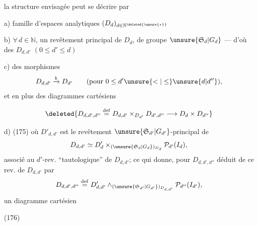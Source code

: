 la structure envisagée peut se décrire par

 a) famille d'espaces analytiques $(D_d)_{d\in\mathbb N^{\deleted{\unsure{*}}}}$

 b) $\forall\,d\in\mathbb N$, un revêtement principal  de $D_d$, de groupe $\unsure{\mathfrak S_d|G_d}$ --- d'où des $D_{d,d'}$ $(0\leq d'\leq d)$


 c) des morphismes
\[
D_{d,d'}\xrightarrow{b}D_{d'}\qquad(\text{pour }0\leq d'\unsure{<|\leq}\unsure{d|d''}),
\]
et en plus des diagrammes cartésiens

\[
\deleted{D_{d,d',d''}\overset{\mathrm{def}}{=}D_{d,d'}\mathbin\times_{D_{d'}}D_{d',d''}\longrightarrow D_d\mathbin\times D_{d''}}
\]

 d) \quad(175)
où $D'_{d,d'}$ est le revêtement $\unsure{\mathfrak S_{d'}|G_{d'}}$-principal de
\[
D_{d,d'}\simeq D'_d\mathbin\times_{(\unsure{\mathfrak S_d|G_d})_{D_d}}\mathcal P_{d'}(I_d),
\]
associé au $d'$-rev. ``tautologique'' de $D_{d,d'}$; ce qui donne, pour $D_{d,d',d''}$ déduit de ce rev. de $D_{d,d'}$ par
\[
D_{d,d',d''}\overset{\mathrm{def}}{=}D'_{d,d'}\mathbin\wedge_{(\unsure{\mathfrak S_{d'}|G_{d'}})_{D_{d,d'}}}\mathcal P_{d''}(I_{d'}),
\]
un  diagramme cartésien

(176)\quad
{}
